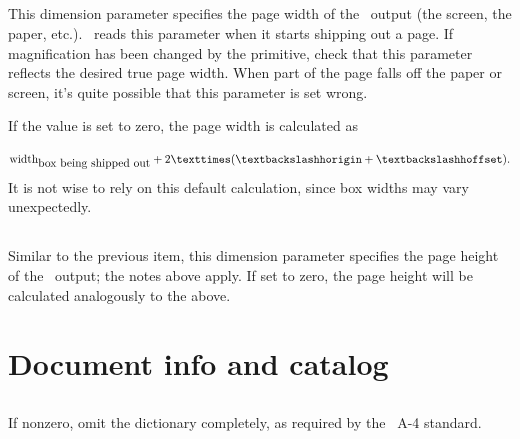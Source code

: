 \documentclass{pdftexmanual}
\begin{document}
\subsection{}

This dimension parameter specifies the page width of the \PDF\ output
(the screen, the paper, etc.). \PDFTEX\ reads this parameter when it
starts shipping out a page. If magnification has been changed by the
 primitive, check that this parameter reflects the desired true
page width. When part of the page falls off the paper or screen, it's
quite possible that this parameter is set wrong.

If the value is set to zero, the page width is calculated as

\[
\hbox{\textit{width}}_{\hbox{\scriptsize box being shipped out}}
+ 2 \times (\cs{horigin} + \hbox{\cs{hoffset}}).
\]
It is not wise to rely on this default calculation, since box widths may
vary unexpectedly.

\subsection{}

Similar to the previous item, this dimension parameter specifies the
page height of the \PDF\ output; the notes above apply. If set to zero,
the page height will be calculated analogously to the above.

\section{Document info and catalog}
\label{sec.docinfocatalog}

\subsection{}

If nonzero, omit the  dictionary completely, as required by
the \PDF\ A-4 standard. 

\subsection{}
\end{document}

